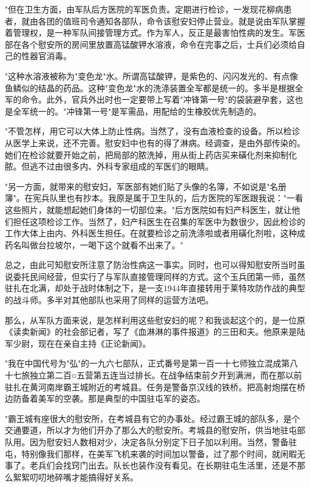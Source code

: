 \documentclass[12pt,UTF8]{ctexbook}
\begin{document}
"但在卫生方面，由军队后方医院的军医负责。定期进行检诊，一发现花柳病患者，就由各团的值班司令通知各部队，命令该慰安妇停止营业。就是说由军队掌握着管理权，是一种军队间接管理方式。作为军人，反正是最害怕性病的发生。军医部在各个慰安所的房间里放置高锰酸钾水溶液，命令在完事之后，士兵们必须给自己的性器官消毒。



"这种水溶液被称为"变色龙"水。所谓高锰酸钾，是紫色的、闪闪发光的、有点像鱼鳞似的结晶的药品。这种"变色龙"水的洗涤装置全军都是统一的。多半是根据全军的命令。此外，官兵外出时也一定要带上写着"冲锋第一号"的袋装避孕套，这也是全军统一的。"冲锋第一号"是军需品，用配给的生橡胶优先制造的。



"不管怎样，用它可以大体上防止性病。当然了，没有血液检查的设备。所以检诊从医学上来说，还不完善。慰安妇中也有的得了淋病。经调查，是由外部传染的。她们在检诊就要开始之前，把局部的脓洗掉，用从街上药店买来磺化剂来抑制化脓。但逃不过由很多内、外科专家组成的军医们的眼睛。



"另一方面，就带来的慰安妇，军医部有她们贴了头像的名簿，不如说是"名册簿"。在宪兵队里也有抄本。我原是属于卫生队的，后方医院的军医跟我说："一看这些照片，就能想起她们身体的一切部位来。"后方医院如有妇产科医生，就让他们担任这项检诊工作。当然了，妇产科医生在召集的军医中为数很少，因此检诊的工作大体上由内、外科医生担任。在就要检诊之前洗涤啦或者用磺化剂啦，这种成药名叫做台拉坡尔，一喝下这个就看不出来了。"



总之，由此可知慰安所注意了防治性病这一事实。同时，也可以得知慰安所当时虽说委托民间经营，但实行了与军队直接管理同样的方式。这个玉兵团第一师，虽然驻扎在北满，却处于战时体制之下，是一支1944年直接转用于莱特攻防作战的典型的战斗师。多半对其他部队也采用了同样的运营方法吧。



那么，从军队方面来说，是怎样利用这些慰安妇的呢？和我谈起这个的，是一位原《读卖新闻》的社会部记者，写了《血淋淋的事件报道》的三田和夫。他原来是陆军少尉，现在在亲自主持《正论新闻》。



"我在中国代号为"弘"的一九六七部队，正式番号是第一百一十七师独立混成第八十七旅独立第二百○五营第五连当过排长。在战争结束前夕开到满洲，而在那以前驻扎在黄河南岸霸王城附近的考城县。任务是警备京汉线的铁桥。把高射炮摆在桥边防备着美军的空袭。那是典型的中国驻屯军的姿态。



"霸王城有座很大的慰安所，在考城县有它的办事处。经过霸王城的部队多，是个交通要道，所以才为他们开办了那么大的慰安所。考城县的慰安所，供当地驻屯部队用。因为慰安妇人数相对少，决定各队分别定下日子加以利用。当然，警备驻屯，特别像我们那样，在美军飞机来袭的时间加以警备，过了那个时间，就闲暇无事了。老兵们会找窍门出去。队长也装作没有看见。在长期驻屯生活里，还是不那么絮絮叨叨地碎嘴才能搞得好关系。
\end{document}
